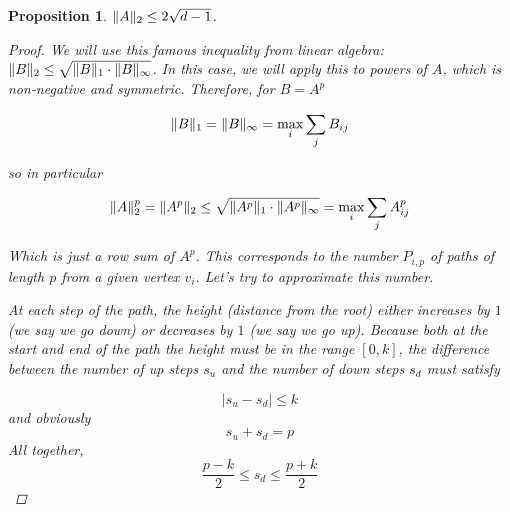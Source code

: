 \documentclass{amsart}
\theoremstyle{plain}
\newtheorem*{proposition}{\textbf{Proposition}}
\theoremstyle{definition}
\DeclarePairedDelimiter{\norm}{\lVert}{\rVert}
\begin{document}
    \begin{proposition} \label{prop:a}
        $\norm{A}_2 \leq 2 \sqrt{d - 1}$.
        \begin{proof}
            We will use this famous inequality from linear algebra:
            $\norm{B}_2 \leq \sqrt{ \norm{B}_1 \cdot \norm{B}_\infty }$.
            In this case, we will apply this to powers of $A$, which is non-negative and symmetric.
            Therefore, for $B = A^p$

            \begin{equation*}
                \norm{B}_1 = \norm{B}_{\infty} = \max_{i} \sum_{j} B_{ij}
            \end{equation*}

            so in particular

            \begin{equation}
                \norm{A}_2^p = \norm{A^p}_2 \leq \sqrt{\norm{A^p}_1 \cdot \norm{A^p}_{\infty}} = \max_{i} \sum_{j} A^p_{ij}
                \label{eq:norm_bound}
            \end{equation}

            Which is just a row sum of $A^p$.
            This corresponds to the number $P_{i, p}$ of paths of length $p$ from a given vertex $v_i$.
            Let's try to approximate this number.

            At each step of the path, the height (distance from the root) either increases by $1$
            (we say we go \emph{down})
            or decreases by $1$ (we say we go \emph{up}).
            Because both at the start and end of the path the height must be in the range $[0, k]$,
            the difference between the number of \emph{up} steps $s_{u}$
            and the number of \emph{down} steps $s_{d}$ must satisfy

            \begin{equation*}
                \lvert s_{u} - s_{d} \rvert \leq k
            \end{equation*}
            and obviously
            \begin{equation*}
                s_{u} + s_{d} = p
            \end{equation*}
            All together,
            \begin{equation*}
                \frac{p-k}{2} \leq s_d \leq  \frac{p+k}{2}
            \end{equation*}


\end{proof}
\end{proposition}
\end{document}
